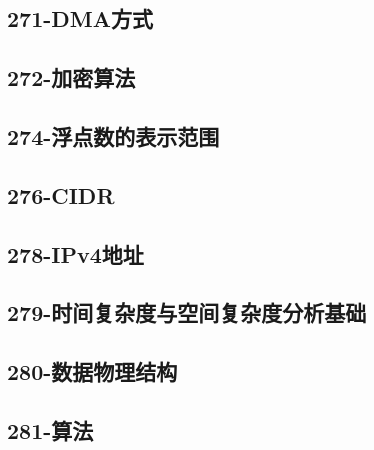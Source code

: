 \subsection{271-DMA方式}

\subsection{272-加密算法}

\subsection{274-浮点数的表示范围}

\subsection{276-CIDR}

\subsection{278-IPv4地址}

\subsection{279-时间复杂度与空间复杂度分析基础}

\subsection{280-数据物理结构}

\subsection{281-算法}


